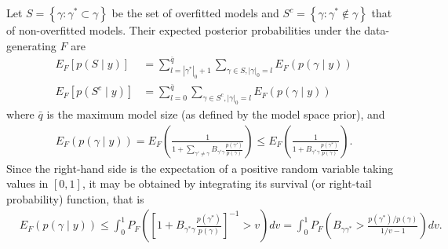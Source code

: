 Let $S= \left\{ \gamma : \gamma^* \subset \gamma \right\}$ be the set of overfitted models and $S^c= \left\{  \gamma: \gamma^* \not\in \gamma \right\}$ that of non-overfitted models.
Their expected posterior probabilities under the data-generating $F$ are
\begin{align}
 E_F\left[ p(S \mid y) \right]&=
\sum_{l=|\gamma^*|_0+1}^{\bar{q}} \sum_{\gamma \in S, |\gamma|_0=l} E_F \left( p(\gamma \mid y) \right)
\label{seq:pp_spurious} \\
 E_F\left[ p(S^c \mid y) \right]&= \sum_{l=0}^{\bar{q}} \sum_{\gamma \in S^c, |\gamma|_0=l} E_F \left( p(\gamma \mid y) \right)
\label{seq:pp_nonspurious}
\end{align}
where $\bar{q}$ is the maximum model size (as defined by the model space prior), and
\begin{align}
 E_F \left( p(\gamma \mid y) \right)=
E_F \left( \frac{1}{1 + \sum_{\gamma' \neq \gamma} B_{\gamma' \gamma} \frac{p(\gamma')}{p(\gamma)}} \right)
\leq E_F \left( \frac{1}{1 + B_{\gamma^* \gamma} \frac{p(\gamma^*)}{p(\gamma)}} \right).
\nonumber
\end{align}
Since the right-hand side is the expectation of a positive random variable taking values in $[0,1]$, it may be obtained by integrating its survival (or right-tail probability) function, that is
\begin{align}
 & E_F (p(\gamma \mid y)) \leq
\int_0^1 P_F \left( \left[ 1 + B_{\gamma^* \gamma} \frac{p(\gamma^*)}{p(\gamma)} \right]^{-1} > v \right) dv
=\int_0^1 P_F \left( B_{\gamma \gamma^*} > \frac{p(\gamma^*)/p(\gamma)}{1/v -1} \right) dv.
\label{seq:pp_singlemodel}
\end{align}


